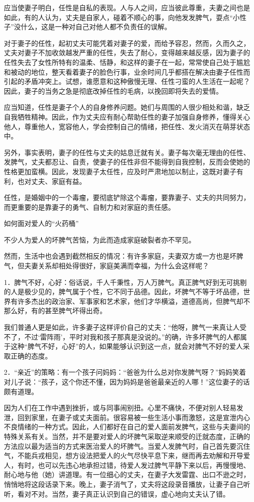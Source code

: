 \documentclass[12pt,UTF8]{ctexbook}
\begin{document}
应当使妻子明白，任性是自私的表现。人与人之间，应当彼此尊重，夫妻之间也是如此，有的人认为，丈夫是自家人，碰着不顺心的事，向他发发脾气，耍点“小性子”没什么，这是一种对自己对他人都不负责任的误解。

对于妻子的任性，起初丈夫可能凭着对妻子的爱，而给予容忍，然而，久而久之，丈夫对妻子不加收敛越发严重的任性，失去了耐心，变得越来越反感，因为妻子的任性失去了女性所特有的温柔、恬静，和这样的妻子在一起，常常使自己处于尴尬和被动的地位，整天看着妻子的脸色行事，业余时间几乎都搭在解决由妻子任性而引起的矛盾冲突上。试想，谁愿意和这种傲慢无理、任性刁蛮的人生活在一起呢？因此，妻子的当务之急是彻底改掉任性的毛病，以挽回即将失去的爱情。

应当知道，任性是妻子个人的自身修养问题。她们与周围的人很少相处和谐，缺乏自我牺牲精神。因此，作为丈夫应有耐心帮助任性的妻子加强自身修养，懂得关心他人，尊重他人，宽容他人，学会控制自己的情绪，把任性、发火消灭在萌芽状态中。

另外，事实表明，妻子的任性与丈夫的姑息迁就有关。妻子每次毫无理由的任性、发脾气，丈夫都忍让、自责，使妻子的任性非但不能得到自我控制，反而会使她的性格更加蛮横。因此，发现妻子太任性，应及时严肃地加以制止，这既对妻子有利，也对丈夫、家庭有益。

任性，是婚姻中的一个毒瘤，要彻底铲除这个毒瘤，要靠妻子、丈夫的共同努力，而更重要的是靠妻子的勇气、自制力和对家庭的责任感。





如何面对爱人的“火药桶”


不少人为爱人的坏脾气苦恼，为此而造成家庭破裂者亦不罕见。

然而，生活中也会遇到截然相反的情况：有许多家庭，夫妻双方或一方也是坏脾气，但夫妻关系却相处得很好，家庭美满而幸福，为什么会这样呢？

1．脾气不好，心好：俗话说，千人千秉性，万人万脾气。真正脾气好到无可挑剔的人是极少见的，脾气属于个性，它不同于品德。因此，坏脾气不等于坏品德，世界有许多杰出的政治家、军事家和艺术家，他们才华横溢，道德高尚，但脾气却不那么好，有的甚至脾气坏得出奇。

我们普通人更是如此，许多妻子这样评价自己的丈夫：“他呀，脾气一来真让人受不了，不过‘雷阵雨’，平时对我和孩子那真是没说的。”的确，许多坏脾气的人都属于这种“脾气不好，心好”的人，如果能够认识到这一点，就会对脾气不好的爱人采取正确的态度。

2．“亲近”的策略：有一个孩子问妈妈：“爸爸为什么总对你发脾气呀？”妈妈笑着对儿子说：“孩子，这个你还不懂，因为妈妈是爸爸最亲近的人哪！”这位妻子的话颇有道理。

因为人们在工作中遇到挫折，或与同事闹别扭。心里不痛快，不便对别人轻易发泄，回到家里，在妻子或丈夫面前。很容易被一些生活小事而激怒，这是宣泄内心不良情绪的一种方式。因此，人们都好在自己的爱人面前发脾气，这些与夫妻间的特殊关系有关。当然，并不是要对爱人的坏脾气采取逆来顺受的迁就态度，正确的方法应以最为适当的方式来医治爱人的坏脾气。当爱人发脾气时，自己首先要沉住气，不能兵戎相见，想方设法把爱人的火气尽快平息下来，继而再去劝解和开导爱人，有时，也可以先违心地承担过错，待爱人发过脾气平静下来以后，再慢慢地、耐心地与他（她）讲道理。有一位细心的丈夫，在妻子大发雷霆、出口不逊之时，悄悄地将这段话录下来。晚上，妻子消气了，丈夫将这段录音播放，让妻子自己听听，看对不对。当然，妻子真正认识到自己的错误，虚心地向丈夫认了错。
\end{document}
